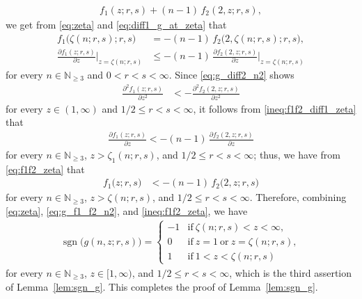 \documentclass[conference, draftcls, onecolumn]{IEEEtran}
\theoremstyle{plain}
\newcommand{\sgn}{\operatorname{sgn}}
\newcommand{\lemref}[1]{Lemma~\ref{#1}}
\begin{document}
\begin{IEEEproof}[Proof of \lemref{lem:sgn_g}]
\begin{align}
f_{1}(z; r, s) + (n-1) \, f_{2}(2, z; r, s) ,
\label{eq:g_f1_f2_n2}
\end{align}
we get from \eqref{eq:zeta} and \eqref{eq:diff1_g_at_zeta} that
\begin{align}
f_{1} \big( \zeta(n; r, s); r, s \big)
& =
- (n-1) \, f_{2} \big( 2, \zeta(n; r, s); r, s \big) ,
\label{eq:f1f2_zeta} \\
\frac{ \partial f_{1}(z; r, s) }{ \partial z } \bigg|_{z = \zeta(n; r, s)}
& \le
- (n-1) \, \frac{ \partial f_{2}(2, z; r, s) }{ \partial z } \bigg|_{z = \zeta(n; r, s)}
\label{ineq:f1f2_diff1_zeta}
\end{align}
for every $n \in \mathbb{N}_{\ge 3}$ and $0 < r < s < \infty$.
Since \eqref{eq:g_diff2_n2} shows
\begin{align}
\frac{ \partial^{2} f_{1}(z; r, s) }{ \partial z^{2} }
& <
- \frac{ \partial^{2} f_{2}(2, z; r, s) }{ \partial z^{2} }
\end{align}
for every $z \in (1, \infty)$ and $1/2 \le r < s < \infty$, it follows from \eqref{ineq:f1f2_diff1_zeta} that
\begin{align}
\frac{ \partial f_{1}(z; r, s) }{ \partial z }
<
- (n-1) \, \frac{ \partial f_{2}(2, z; r, s) }{ \partial z }
\end{align}
for every $n \in \mathbb{N}_{\ge 3}$, $z > \zeta_{1}(n; r, s)$, and $1/2 \le r < s < \infty$;
thus, we have from \eqref{eq:f1f2_zeta} that
\begin{align}
f_{1} \big( z; r, s \big)
& <
- (n-1) \, f_{2} \big( 2, z; r, s \big)
\label{ineq:f1f2_zeta}
\end{align}
for every $n \in \mathbb{N}_{\ge 3}$, $z > \zeta(n; r, s)$, and $1/2 \le r < s < \infty$. 
Therefore, combining \eqref{eq:zeta}, \eqref{eq:g_f1_f2_n2}, and \eqref{ineq:f1f2_zeta}, we have
\begin{align}
\sgn \Big( g(n, z; r, s) \Big)
=
\begin{cases}
-1
& \mathrm{if} \ \zeta(n; r, s) < z < \infty ,
\\
0
& \mathrm{if} \ z = 1 \ \mathrm{or} \ z = \zeta(n; r, s) ,
\\
1
& \mathrm{if} \ 1 < z < \zeta(n; r, s)
\end{cases}
\end{align}
for every $n \in \mathbb{N}_{\ge 3}$, $z \in [1, \infty)$, and $1/2 \le r < s < \infty$, which is the third assertion of \lemref{lem:sgn_g}.
This completes the proof of \lemref{lem:sgn_g}.
\end{IEEEproof}
\end{document}
